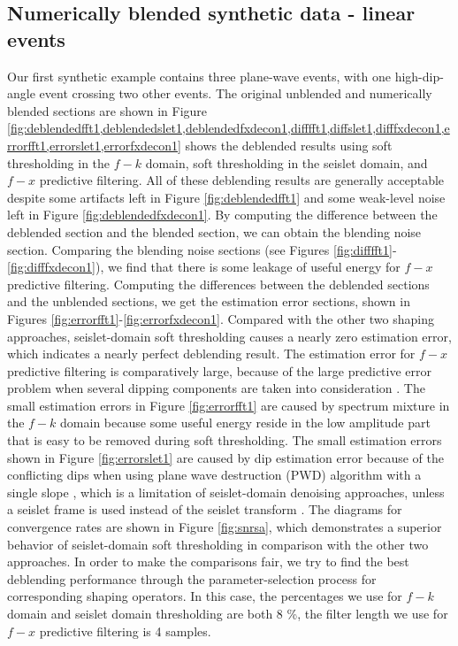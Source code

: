 \subsection{Numerically blended synthetic data - linear events}
Our first synthetic example contains three plane-wave events, with one high-dip-angle event crossing two other events.
The original unblended and numerically blended sections are shown in 
Figure \ref{fig:deblendedfft1,deblendedslet1,deblendedfxdecon1,difffft1,diffslet1,difffxdecon1,errorfft1,errorslet1,errorfxdecon1} shows the deblended results using soft thresholding in the $f-k$ domain, soft thresholding in the seislet domain, and $f-x$ predictive filtering. 
All of these deblending results are generally acceptable despite some artifacts left in Figure \ref{fig:deblendedfft1} and some weak-level noise left in Figure \ref{fig:deblendedfxdecon1}. By computing the difference between the deblended section and the blended section, we can obtain the blending noise section. Comparing the blending noise sections (see Figures \ref{fig:difffft1}-\ref{fig:difffxdecon1}), we find that there is some leakage of useful energy for $f-x$ predictive filtering. Computing the differences between the deblended sections and the unblended sections, we get the estimation error sections, shown in Figures \ref{fig:errorfft1}-\ref{fig:errorfxdecon1}. Compared with the other two shaping approaches, seislet-domain soft thresholding causes a nearly zero estimation error, which indicates a nearly perfect deblending result. The estimation error for $f-x$ predictive filtering is comparatively large, because of the large predictive error problem when several dipping components are taken into consideration \cite[]{yangkang2014}. The small estimation errors in Figure \ref{fig:errorfft1} are caused by spectrum mixture in the $f-k$ domain because some useful energy reside in the low amplitude part that is easy to be removed during soft thresholding. The small estimation errors shown in Figure \ref{fig:errorslet1} are caused by dip estimation error because of the conflicting dips when using plane wave destruction (PWD) algorithm with a single slope \cite[]{pwd}, which is a limitation of seislet-domain denoising approaches, unless a seislet frame is used instead of the seislet transform \cite[]{seislet}. The diagrams for convergence rates are shown in Figure \ref{fig:snrsa}, which demonstrates a superior behavior of seislet-domain soft thresholding in comparison with the other two approaches. In order to make the comparisons fair, we try to find the best deblending performance through the parameter-selection process for corresponding shaping operators. In this case, the percentages we use for $f-k$ domain and seislet domain thresholding are both 8 \%, the filter length we use for $f-x$ predictive filtering is 4 samples. 




